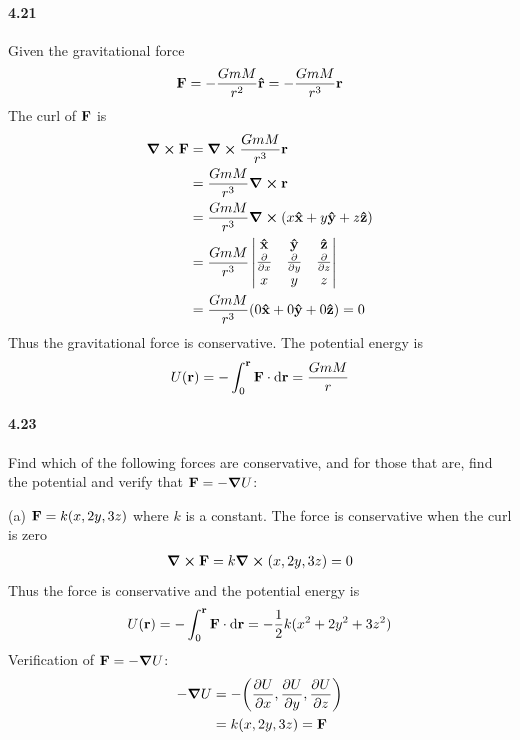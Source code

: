 \documentclass[../problems.tex]{subfiles}
\begin{document}
\paragraph{4.21}
Given the gravitational force
\begin{align*}
    \vb{F} = - \frac{GmM}{r^2} \vu{r} = - \frac{GmM}{r^3} \vb{r}
\end{align*}
The curl of $\vb{F}$ is
\begin{align*}
    \curl{\vb{F}} &= \curl{\frac{GmM}{r^3} \vb{r}} \\
    &= \frac{GmM}{r^3} \curl{\vb{r}} \\
    &= \frac{GmM}{r^3} \curl{(x \vu{x} + y \vu{y} + z \vu{z})} \\
    &= \frac{GmM}{r^3}
    \begin{vmatrix}
        \vu{x} & \vu{y} & \vu{z} \\
        \pdv{x} & \pdv{y} & \pdv{z} \\
        x & y & z
    \end{vmatrix} \\
    &= \frac{GmM}{r^3} (0 \vu{x} + 0 \vu{y} + 0 \vu{z}) = 0
\end{align*}
Thus the gravitational force is conservative. The potential energy is
\begin{align*}
    U(\vb{r}) = - \int_0^{\vb{r}} \vb{F} \cdot \dd{\vb{r}} = \frac{GmM}{r}
\end{align*}

\paragraph{4.23}
Find which of the following forces are conservative, and for those that are, find the potential and
verify that $\vb{F} = - \grad{U}$:

(a) $\vb{F} = k(x, 2y, 3z)$ where $k$ is a constant. The force is conservative when the curl is zero
\begin{align*}
    \curl{\vb{F}} = k \curl{(x, 2y, 3z)} = 0
\end{align*}
Thus the force is conservative and the potential energy is
\begin{align*}
    U(\vb{r}) = - \int_0^{\vb{r}} \vb{F} \cdot \dd{\vb{r}} = -\frac{1}{2} k(x^2 + 2y^2 + 3z^2)
\end{align*}
Verification of $\vb{F} = - \grad{U}$:
\begin{align*}
    -\grad{U} &= -\quantity(\pdv{U}{x}, \pdv{U}{y}, \pdv{U}{z}) \\
    &= k(x, 2y, 3z) = \vb{F}
\end{align*}
\end{document}
